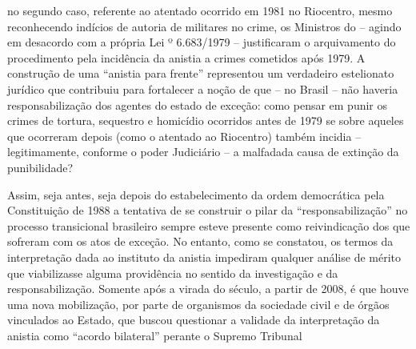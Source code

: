 no segundo caso, referente ao atentado ocorrido em 1981 no Riocentro,
mesmo reconhecendo indícios de autoria de militares no crime, os
Ministros do  -- agindo em desacordo com a própria Lei º 6.683/1979
-- justificaram o arquivamento do procedimento pela incidência da
anistia a crimes cometidos após 1979. A construção de uma ``anistia para
frente'' representou um verdadeiro estelionato jurídico que contribuiu
para fortalecer a noção de que -- no Brasil -- não haveria
responsabilização dos agentes do estado de exceção: como pensar em punir
os crimes de tortura, sequestro e homicídio ocorridos antes de 1979 se
sobre aqueles que ocorreram depois (como o atentado ao Riocentro) também
incidia -- legitimamente, conforme o poder Judiciário -- a malfadada
causa de extinção da punibilidade?

Assim, seja antes, seja depois do estabelecimento da ordem democrática
pela Constituição de 1988 a tentativa de se construir o pilar da
``responsabilização'' no processo transicional brasileiro sempre esteve
presente como reivindicação dos que sofreram com os atos de exceção. No
entanto, como se constatou, os termos da interpretação dada ao instituto
da anistia impediram qualquer análise de mérito que viabilizasse alguma
providência no sentido da investigação e da responsabilização. Somente
após a virada do século, a partir de 2008, é que houve uma nova
mobilização, por parte de organismos da sociedade civil e de órgãos
vinculados ao Estado, que buscou questionar a validade da interpretação
da anistia como ``acordo bilateral'' perante o Supremo Tribunal
